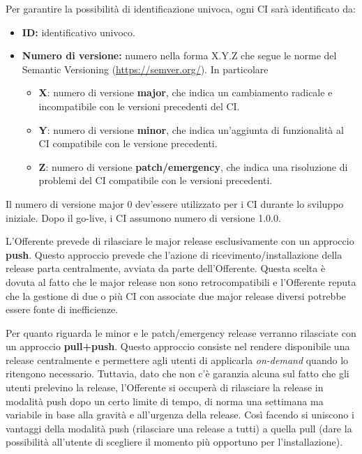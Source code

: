              Per garantire la possibilità di identificazione univoca, ogni CI sarà identificato da:
              \begin{itemize}
              \item \textbf{ID:} identificativo univoco.
              \item \textbf{Numero di versione:} numero nella forma X.Y.Z che segue le norme del Semantic Versioning (\url{https://semver.org/}). In particolare
              \begin{itemize}
              \item \textbf{X}: numero di versione \textbf{major}, che indica un cambiamento radicale e incompatibile con le versioni precedenti del CI.
              \item \textbf{Y}: numero di versione \textbf{minor}, che indica un'aggiunta di funzionalità al CI compatibile con le versione precedenti.
              \item \textbf{Z}: numero di versione \textbf{patch/emergency}, che indica una risoluzione di problemi del CI compatibile con le versioni precedenti.
              \end{itemize}
              \end{itemize}
              Il numero di versione major 0 dev'essere utilizzato per i CI durante lo sviluppo iniziale. Dopo il go-live, i CI assumono numero di versione 1.0.0.
              
              
              L'Offerente prevede di rilasciare le major release esclusivamente con un approccio \textbf{push}. Questo approccio prevede che l'azione di ricevimento/installazione della release parta centralmente, avviata da parte dell'Offerente. Questa scelta è dovuta al fatto che le major release non sono retrocompatibili e l'Offerente reputa che la gestione di due o più CI con associate due major release diversi potrebbe essere fonte di inefficienze.
              
              
              Per quanto riguarda le minor e le patch/emergency release verranno rilasciate con un approccio \textbf{pull+push}. Questo approccio consiste nel rendere disponibile una release centralmente e permettere agli utenti di applicarla \textit{on-demand} quando lo ritengono necessario. Tuttavia, dato che non c'è garanzia alcuna sul fatto che gli utenti prelevino la release, l'Offerente si occuperà di rilasciare la release in modalità push dopo un certo limite di tempo, di norma una settimana ma variabile in base alla gravità e all'urgenza della release. Così facendo si uniscono i vantaggi della modalità push (rilasciare una release a tutti) a quella pull (dare la possibilità all'utente di scegliere il momento più opportuno per l'installazione).
              
